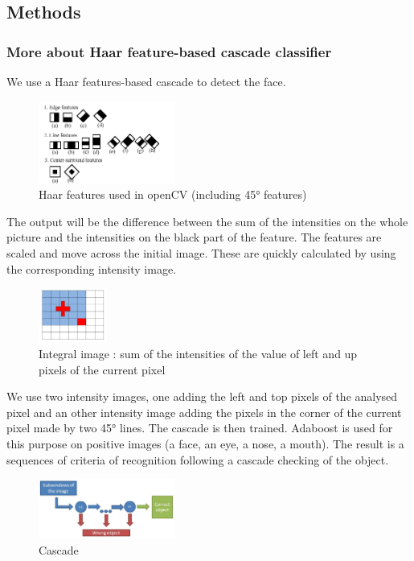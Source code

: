\subsection{Methods}
\subsubsection{More about Haar feature-based cascade classifier}
We use a Haar features-based cascade to detect the face.
\begin{figure}[ht]
	\centering		
	\includegraphics[width = 0.4\textwidth]{rsrc/Haarfeatures.png}
	\caption{Haar features used in openCV (including 45° features)}
	\label{fig:Haar features}
\end{figure}
The output will be the difference between the sum of the intensities on the whole picture and the intensities on the black part of the feature. The features are scaled and move across the initial image. These are quickly calculated by using the corresponding intensity image.
\begin{figure}[ht]
	\centering		
	\includegraphics[width = 0.2\textwidth]{rsrc/IntegralImage.jpg}
	\caption{Integral image : sum of the intensities of the value of left and up pixels of the current pixel}
	\label{fig:Integral image}
\end{figure}
We use two intensity images, one adding the left and top pixels of the analysed pixel and an other intensity image adding the pixels in the corner of the current pixel made by two 45° lines.
The cascade is then trained. Adaboost is used for this purpose on positive images (a face, an eye, a nose, a mouth). The result is a sequences of criteria of recognition following a cascade checking of the object.
\begin{figure}[ht]
	\centering		
	\includegraphics[width = 0.4\textwidth]{rsrc/Cascade.jpg}
	\caption{Cascade}
	\label{fig:Cascade}
\end{figure}



